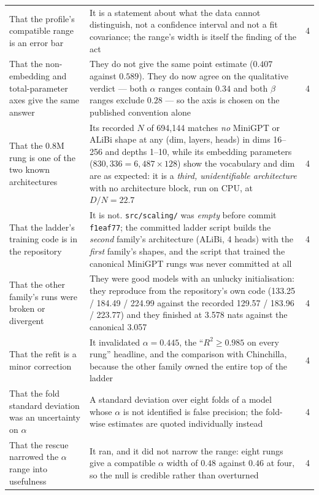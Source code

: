 \documentclass[11pt,a4paper]{article}
\begin{document}
\begin{longtable}{L{8.0cm}L{4.4cm}L{1.4cm}}
That the profile's compatible range is an error bar & It is a statement about what the data cannot distinguish, not a confidence interval and not a fit covariance; the range's width is itself the finding of the act & 4 \\
That the non-embedding and total-parameter axes give the same answer & They do not give the same point estimate ($0.407$ against $0.589$). They do now agree on the qualitative verdict --- both $\alpha$ ranges contain $0.34$ and both $\beta$ ranges exclude $0.28$ --- so the axis is chosen on the published convention alone & 4 \\
That the 0.8M rung is one of the two known architectures & Its recorded $N$ of 694,144 matches \emph{no} MiniGPT or ALiBi shape at any (dim, layers, heads) in dims 16--256 and depths 1--10, while its embedding parameters ($830{,}336 = 6{,}487 \times 128$) show the vocabulary and dim are as expected: it is a \emph{third, unidentifiable architecture} with no architecture block, run on CPU, at $D/N = 22.7$ & 4 \\
That the ladder's training code is in the repository & It is not. \texttt{src/scaling/} was \emph{empty} before commit \texttt{f1eaf77}; the committed ladder script builds the \emph{second} family's architecture (ALiBi, 4 heads) with the \emph{first} family's shapes, and the script that trained the canonical MiniGPT rungs was never committed at all & 4 \\
That the other family's runs were broken or divergent & They were good models with an unlucky initialisation: they reproduce from the repository's own code (133.25 / 184.49 / 224.99 against the recorded 129.57 / 183.96 / 223.77) and they finished at 3.578 nats against the canonical 3.057 & 4 \\
That the refit is a minor correction & It invalidated $\alpha = 0.445$, the ``$R^2 \geq 0.985$ on every rung'' headline, and the comparison with Chinchilla, because the other family owned the entire top of the ladder & 4 \\
That the fold standard deviation was an uncertainty on $\alpha$ & A standard deviation over eight folds of a model whose $\alpha$ is not identified is false precision; the fold-wise estimates are quoted individually instead & 4 \\
That the rescue narrowed the $\alpha$ range into usefulness & It ran, and it did not narrow the range: eight rungs give a compatible $\alpha$ width of $0.48$ against $0.46$ at four, so the null is credible rather than overturned & 4 \\

\end{longtable}
\end{document}

